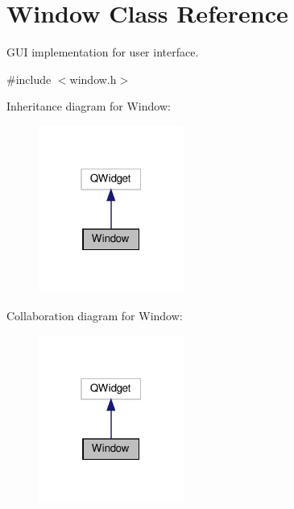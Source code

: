\hypertarget{class_window}{}\section{Window Class Reference}
\label{class_window}


G\+UI implementation for user interface.  




{\ttfamily \#include $<$window.\+h$>$}



Inheritance diagram for Window\+:
\nopagebreak
\begin{figure}[H]
\begin{center}
\leavevmode
\includegraphics[width=135pt]{class_window__inherit__graph}
\end{center}
\end{figure}


Collaboration diagram for Window\+:
\nopagebreak
\begin{figure}[H]
\begin{center}
\leavevmode
\includegraphics[width=135pt]{class_window__coll__graph}
\end{center}
\end{figure}
